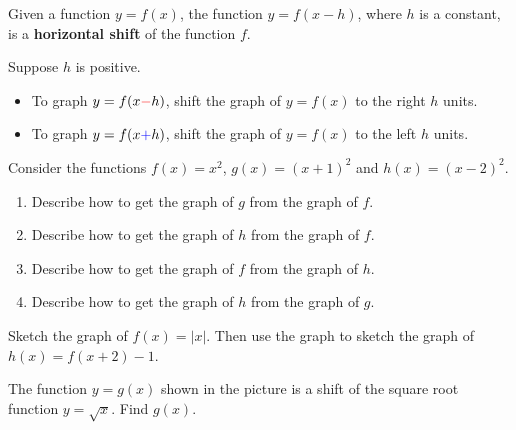 \begin{definition}
  Given a function \(y=f(x)\), the function \(y=f(x-h)\), where \(h\) is a constant, is a \textbf{horizontal shift} of the function \(f\). 
  \end{definition}

\begin{howto}
  Suppose $h$ is positive. 
\begin{itemize}
  \item To graph $y=f(x {\color{red} -} h)$, shift the graph of $y=f(x)$ to the {\color{red} right} $h$ units. 
  \item To graph $y=f(x {\color{blue} +} h)$, shift the graph of $y=f(x)$ to the {\color{blue} left} $h$ units. 
\end{itemize}
\end{howto}

\begin{example}
  Consider the functions $f(x)=x^2$, $g(x)=(x+1)^2$ and $h(x)=(x-2)^2$.
  \begin{enumerate}
    \item Describe how to get the graph of $g$ from the graph of $f$.
    \vspace*{3\baselineskip}
    \item Describe how to get the graph of $h$ from the graph of $f$.
    \vspace*{3\baselineskip}
    \item Describe how to get the graph of $f$ from the graph of $h$.
    \vspace*{3\baselineskip}
    \item Describe how to get the graph of $h$ from the graph of $g$.
    \vspace*{3\baselineskip}
  \end{enumerate}
\end{example}

\newpage

\begin{example}
  Sketch the graph of \(f(x)=|x|\). Then use the graph to sketch the graph of \(h(x)=f(x+2)-1\). 
\end{example}

\begin{example}
  The function $y=g(x)$ shown in the picture is a shift of the square root function $y=\sqrt{x}$. Find $g(x)$.\\

\end{example}
\vspace*{-0.4\textheight}

